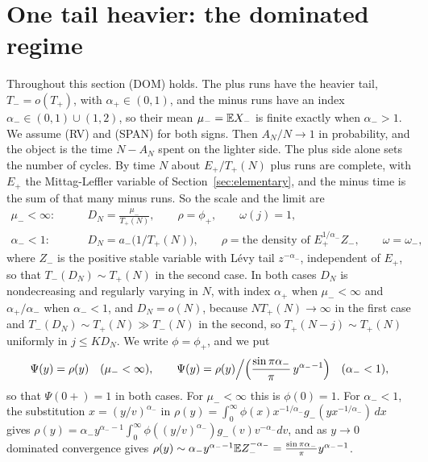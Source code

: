 \section{One tail heavier: the dominated regime}\label{sec:dominated}

Throughout this section (DOM) holds. The plus runs have the heavier tail,
$T_\minus=o(T_\plus)$, with $\alpha_\plus\in(0,1)$, and the minus runs have an index
$\alpha_\minus\in(0,1)\cup(1,2)$, so their mean $\mu_{-}=\mathbb{E} X_{-}$ is finite exactly when
$\alpha_\minus>1$. We assume (RV) and (SPAN) for both signs. Then $A_N/N\to1$ in probability,
and the object is the time $N-A_N$ spent on the lighter side. The plus side alone sets the
number of cycles. By time $N$ about $E_\plus/T_\plus(N)$ plus runs are complete, with
$E_\plus$ the Mittag-Leffler variable of Section~\ref{sec:elementary}, and the minus time is
the sum of that many minus runs. So the scale and the limit are
\begin{align*}
 \mu_\minus<\infty:&\qquad D_N=\frac{\mu_\minus}{T_\plus(N)},\qquad \rho=\phi_\plus,\qquad \omega(j)=1,\\
 \alpha_\minus<1:&\qquad D_N=a_\minus\bigl(1/T_\plus(N)\bigr),\qquad \rho=\text{the density of }E_\plus^{1/\alpha_\minus}Z_\minus,\qquad \omega=\omega_\minus,
\end{align*}
where $Z_\minus$ is the positive stable variable with L\'evy tail $z^{-\alpha_\minus}$,
independent of $E_\plus$, so that $T_\minus(D_N)\sim T_\plus(N)$ in the second case. In both
cases $D_N$ is nondecreasing and regularly varying in $N$, with index $\alpha_\plus$ when
$\mu_\minus<\infty$ and $\alpha_\plus/\alpha_\minus$ when $\alpha_\minus<1$, and $D_N=o(N)$, because
$NT_\plus(N)\to\infty$ in the first case and $T_\minus(D_N)\sim T_\plus(N)\gg T_\minus(N)$ in the
second, so $T_\plus(N-j)\sim T_\plus(N)$ uniformly in $j\le KD_N$. We write $\phi=\phi_\plus$,
and we put
\[
 \Psi(y)=\rho(y)\quad(\mu_{-}<\infty),\qquad
 \Psi(y)=\rho(y)\Big/\Bigl(\frac{\sin\pi\alpha_{-}}\pi\,y^{\alpha_{-}-1}\Bigr)\quad(\alpha_{-}<1),
\]
so that $\Psi(0+)=1$ in both cases. For $\mu_\minus<\infty$ this is $\phi(0)=1$. For
$\alpha_\minus<1$, the substitution $x=(y/v)^{\alpha_\minus}$ in
$\rho(y)=\int_0^\infty\phi(x)x^{-1/\alpha_\minus}g_\minus(yx^{-1/\alpha_\minus})\,dx$ gives
$\rho(y)=\alpha_\minus y^{\alpha_\minus-1}\int_0^\infty\phi((y/v)^{\alpha_\minus})g_\minus(v)v^{-\alpha_\minus}dv$,
and as $y\to0$ dominated convergence gives
$\rho(y)\sim\alpha_{-} y^{\alpha_{-}-1}\mathbb{E} Z_{-}^{-\alpha_{-}}=\frac{\sin\pi\alpha_{-}}\pi y^{\alpha_{-}-1}$.
